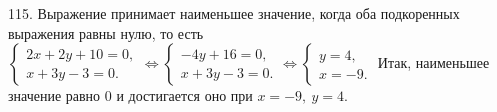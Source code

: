 115. Выражение принимает наименьшее значение, когда оба подкоренных выражения равны нулю, то есть $\begin{cases} 2x+2y+10=0,\\ x+3y-3=0.\end{cases}
\Leftrightarrow \begin{cases} -4y+16=0,\\ x+3y-3=0.\end{cases}\Leftrightarrow \begin{cases} y=4,\\ x=-9.\end{cases}$ Итак, наименьшее значение равно 0 и достигается оно при $x=-9,\ y=4.$\\
